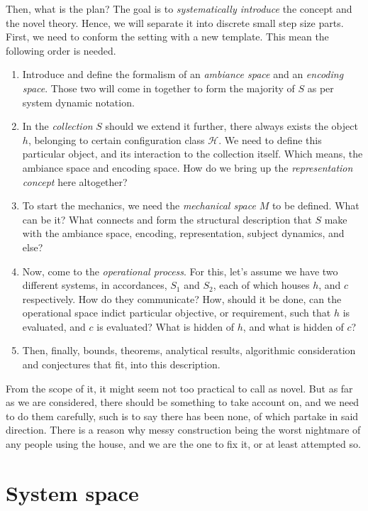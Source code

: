 Then, what is the plan? The goal is to \textit{systematically introduce} the concept and the novel theory. Hence, we will separate it into discrete small step size parts. First, we need to conform the setting with a new template. This mean the following order is needed. 
\begin{enumerate}[leftmargin=1cm,itemsep=2pt,topsep=2pt]
  \item Introduce and define the formalism of an \textit{ambiance space} and an \textit{encoding space}. Those two will come in together to form the majority of $S$ as per system dynamic notation. 
  \item In the \textit{collection} $S$ should we extend it further, there always exists the object $h$, belonging to certain configuration class $\mathcal{H}$. We need to define this particular object, and its interaction to the collection itself. Which means, the ambiance space and encoding space. How do we bring up the \textit{representation concept} here altogether? 
  \item To start the mechanics, we need the \textit{mechanical space} $M$ to be defined. What can be it? What connects and form the structural description that $S$ make with the ambiance space, encoding, representation, subject dynamics, and else? 
  \item Now, come to the \textit{operational process}. For this, let's assume we have two different systems, in accordances, $S_{1}$ and $S_{2}$, each of which houses $h$, and $c$ respectively. How do they communicate? How, should it be done, can the operational space indict particular objective, or requirement, such that $h$ is evaluated, and $c$ is evaluated? What is hidden of $h$, and what is hidden of $c$? 
  \item Then, finally, bounds, theorems, analytical results, algorithmic consideration and conjectures that fit, into this description. 
\end{enumerate}
From the scope of it, it might seem not too practical to call as novel. But as far as we are considered, there should be something to take account on, and we need to do them carefully, such is to say there has been none, of which partake in said direction. There is a reason why messy construction being the worst nightmare of any people using the house, and we are the one to fix it, or at least attempted so. 

\section{System space}

